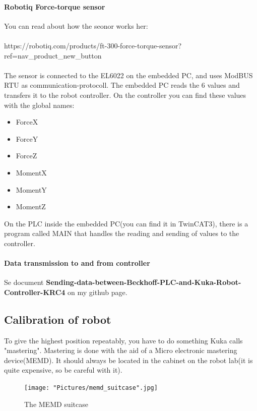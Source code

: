 \documentclass{article}
\begin{document}
        \newpage
        
        \paragraph{Robotiq Force-torque sensor}
        You can read about how the seonor works her:\\\\ https://robotiq.com/products/ft-300-force-torque-sensor?ref=nav\_product\_new\_button
        \\\\
        The sensor is connected to the EL6022 on the embedded PC, and uses ModBUS RTU as communication-protocoll. The embedded PC reads the 6 values and transfers it to the robot controller. On the controller you can find these values with the global names:
        \begin{itemize}
            \item ForceX
            \item ForceY
            \item ForceZ
            \item MomentX
            \item MomentY
            \item MomentZ
        \end{itemize}
        
        On the PLC inside the embedded PC(you can find it in TwinCAT3), there is a program called MAIN that handles the reading and sending of values to the controller. 
        
        \paragraph{Data transmission to and from controller}
        Se document \textbf{Sending-data-between-Beckhoff-PLC-and-Kuka-Robot-Controller-KRC4} on my github page. 

\newpage

    \subsection{Calibration of robot}
        To give the highest position repeatably, you have to do something Kuka calls "mastering". Mastering is done with the aid of a Micro electronic mastering device(MEMD). It should always be located in the cabinet on the robot lab(it is quite expensive, so be careful with it). 
        
        
        \begin{figure}[!h]
            \centering
            \texttt{[image: "Pictures/memd\_suitcase".jpg]}
            \caption{The MEMD suitcase}
        \end{figure}
        
\end{document}
